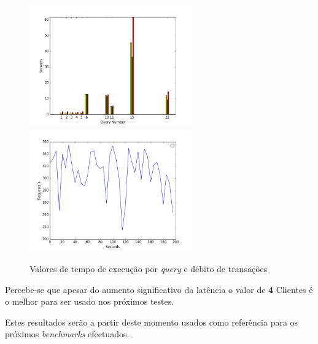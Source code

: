 \begin{figure}[ht!]
\centering
\includegraphics[width=70mm]{img/final1/res_2_0.png}
\includegraphics[width=70mm]{img/final1/res_2_1.png}
\caption{Valores de tempo de execução por \textit{query} e débito de transações}
\end{figure}

Percebe-se que apesar do aumento significativo da latência o valor de \textbf{4} Clientes é o melhor para ser usado nos próximos testes.

Estes resultados serão a partir deste momento usados como referência para os próximos \textit{benchmarks} efectuados.
